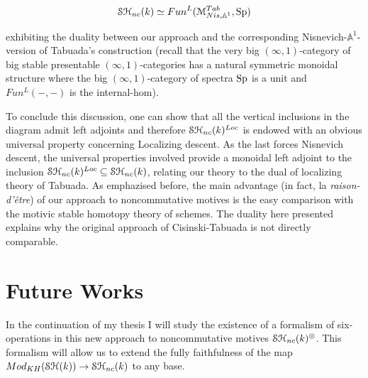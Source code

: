 \begin{refsection}
\begin{equation}
 \mathcal{S}\mathcal{H}_{nc}(k)\simeq Fun^{L}(\mathcal{M}^{Tab}_{Nis, \mathbb{A}^1}, \mathrm{Sp})
\end{equation}

\noindent exhibiting the duality between our approach and the corresponding Nisnevich-$\mathbb{A}^1$-version of Tabuada's construction (recall that the very big $(\infty,1)$-category of big stable presentable $(\infty,1)$-categories has a natural symmetric monoidal structure \cite[6.3.2.10, 6.3.2.18 and 6.3.1.17]{lurie-ha} where the big $(\infty,1)$-category of spectra $\mathrm{Sp}$ is a unit and $Fun^{L}(-,-)$ is the internal-hom).  

To conclude this discussion, one can show that all the vertical inclusions in the diagram admit left adjoints and therefore $\mathcal{S}\mathcal{H}_{nc}(k)^{Loc}$ is endowed with an obvious universal property concerning Localizing descent. As the last forces Nisnevich descent, the universal properties involved provide a monoidal left adjoint to the inclusion $\mathcal{S}\mathcal{H}_{nc}(k)^{Loc}\subseteq\mathcal{S}\mathcal{H}_{nc}(k)$, relating our theory to the dual of localizing theory of Tabuada. As emphazised before, the main advantage (in fact, la \emph{raison-d'être}) of our approach to noncommutative motives is the easy comparison with the motivic stable homotopy theory of schemes. The duality here presented explains why the original approach of Cisinski-Tabuada is not directly comparable.


\section{Future Works}

In the continuation of my thesis I will study the existence of a formalism of six-operations in this new approach to noncommutative motives $\mathcal{S}\mathcal{H}_{nc}(k)^{\otimes}$. This formalism will allow us to extend the fully faithfulness of the map $Mod_{KH}(\mathcal{S}\mathcal{H}(k))\to \mathcal{S}\mathcal{H}_{nc}(k)$ to any base.

\end{refsection}
